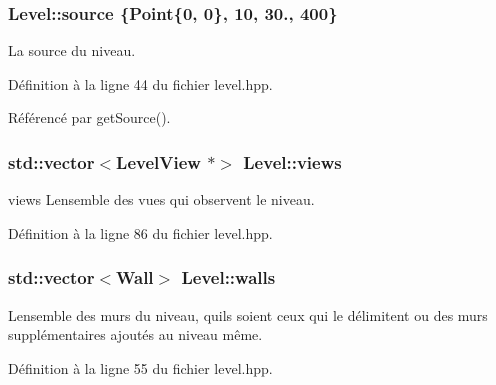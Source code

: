 \hypertarget{classLevel_ad0687b252a6b49e840a34ca5288ead55}{}
\subsubsection[{source}]{ Level\+::source \{{\bf Point}\{0, 0\}, 10, 30., 400\}\hspace{0.3cm}{\ttfamily [private]}}\label{classLevel_ad0687b252a6b49e840a34ca5288ead55}


La source du niveau. 



Définition à la ligne 44 du fichier level.\+hpp.



Référencé par get\+Source().

\hypertarget{classLevel_a8a01947614ab3998f4c152882c113feb}{}
\subsubsection[{views}]{\setlength{\rightskip}{0pt plus 5cm}std\+::vector$<${\bf Level\+View} $\ast$$>$ Level\+::views\hspace{0.3cm}{\ttfamily [private]}}\label{classLevel_a8a01947614ab3998f4c152882c113feb}


views L\textquotesingle{}ensemble des vues qui observent le niveau. 



Définition à la ligne 86 du fichier level.\+hpp.

\hypertarget{classLevel_a6f8ce53f3e8c3a2aadbfe1385c136d5a}{}
\subsubsection[{walls}]{\setlength{\rightskip}{0pt plus 5cm}std\+::vector$<${\bf Wall}$>$ Level\+::walls\hspace{0.3cm}{\ttfamily [private]}}\label{classLevel_a6f8ce53f3e8c3a2aadbfe1385c136d5a}


L\textquotesingle{}ensemble des murs du niveau, qu\textquotesingle{}ils soient ceux qui le délimitent ou des murs supplémentaires ajoutés au niveau même. 



Définition à la ligne 55 du fichier level.\+hpp.



